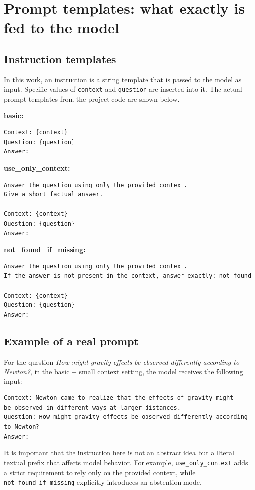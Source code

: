 \documentclass[a4paper,12pt]{article}
\begin{document}
\section{Prompt templates: what exactly is fed to the model}
\subsection{Instruction templates}
In this work, an instruction is a string template that is passed to the model as input. Specific values of \texttt{context} and \texttt{question} are inserted into it. The actual prompt templates from the project code are shown below.

\textbf{basic:}
\begin{verbatim}
Context: {context}
Question: {question}
Answer:
\end{verbatim}

\textbf{use\_only\_context:}
\begin{verbatim}
Answer the question using only the provided context.
Give a short factual answer.

Context: {context}
Question: {question}
Answer:
\end{verbatim}

\textbf{not\_found\_if\_missing:}
\begin{verbatim}
Answer the question using only the provided context.
If the answer is not present in the context, answer exactly: not found

Context: {context}
Question: {question}
Answer:
\end{verbatim}

\subsection{Example of a real prompt}
For the question \textit{How might gravity effects be observed differently according to Newton?}, in the basic + small context setting, the model receives the following input:
\begin{verbatim}
Context: Newton came to realize that the effects of gravity might
be observed in different ways at larger distances.
Question: How might gravity effects be observed differently according to Newton?
Answer:
\end{verbatim}
It is important that the instruction here is not an abstract idea but a literal textual prefix that affects model behavior. For example, \texttt{use\_only\_context} adds a strict requirement to rely only on the provided context, while \texttt{not\_found\_if\_missing} explicitly introduces an abstention mode.
\end{document}
